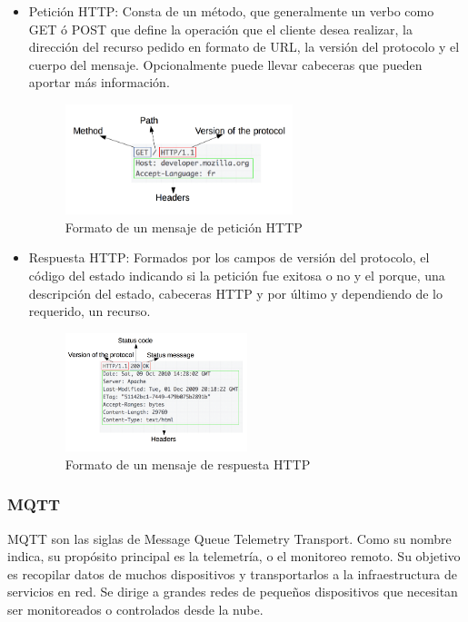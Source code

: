 \begin{itemize}
\item Petición HTTP: Consta de un método, que generalmente un verbo como GET ó POST que define la operación que el cliente desea realizar, la dirección del recurso pedido en formato de URL, la versión del protocolo y el cuerpo del mensaje. Opcionalmente puede llevar cabeceras que pueden aportar más información. 

\begin{figure}[ht]
\centering
\includegraphics[width=0.625\textwidth]{Figuras/HTTP_Request.png}
\caption{\label{fig:httprequest}Formato de un mensaje de petición HTTP}
\vspace*{-15pt}
\end{figure}

\item Respuesta HTTP: Formados por los campos de versión del protocolo, el código del estado indicando si la petición fue exitosa o no y el porque, una descripción del estado, cabeceras HTTP y por último y dependiendo de lo requerido, un recurso.

\begin{figure}[ht]
\centering
\includegraphics[width=0.5\textwidth]{Figuras/HTTP_Response.png}
\caption{\label{fig:httpresponse}Formato de un mensaje de respuesta HTTP}
\vspace*{-15pt}
\end{figure}

\end{itemize}

\subsubsection{MQTT}
MQTT son las siglas de Message Queue Telemetry Transport. Como su nombre indica, su propósito principal es la telemetría, o el monitoreo remoto. Su objetivo es recopilar datos de muchos dispositivos y transportarlos a la infraestructura de servicios en red. Se dirige a grandes redes de pequeños dispositivos que necesitan ser monitoreados o controlados desde la nube.\cite{iotprotocols}\\


